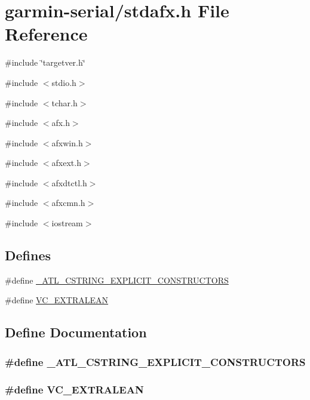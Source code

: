 \hypertarget{garmin-serial_2stdafx_8h}{
\section{garmin-\/serial/stdafx.h File Reference}
\label{garmin-serial_2stdafx_8h}
}
{\ttfamily \#include \char`\"{}targetver.h\char`\"{}}\par
{\ttfamily \#include $<$stdio.h$>$}\par
{\ttfamily \#include $<$tchar.h$>$}\par
{\ttfamily \#include $<$afx.h$>$}\par
{\ttfamily \#include $<$afxwin.h$>$}\par
{\ttfamily \#include $<$afxext.h$>$}\par
{\ttfamily \#include $<$afxdtctl.h$>$}\par
{\ttfamily \#include $<$afxcmn.h$>$}\par
{\ttfamily \#include $<$iostream$>$}\par
\subsection*{Defines}
\begin{DoxyCompactItemize}
\item 
\#define \hyperlink{garmin-serial_2stdafx_8h_a137e19a46f145129447af81af06def9f}{\_\-ATL\_\-CSTRING\_\-EXPLICIT\_\-CONSTRUCTORS}
\item 
\#define \hyperlink{garmin-serial_2stdafx_8h_a0172fbace36625330d5f0f163a1ddc1a}{VC\_\-EXTRALEAN}
\end{DoxyCompactItemize}


\subsection{Define Documentation}
\hypertarget{garmin-serial_2stdafx_8h_a137e19a46f145129447af81af06def9f}{
\subsubsection[{\_\-ATL\_\-CSTRING\_\-EXPLICIT\_\-CONSTRUCTORS}]{\setlength{\rightskip}{0pt plus 5cm}\#define \_\-ATL\_\-CSTRING\_\-EXPLICIT\_\-CONSTRUCTORS}}
\label{garmin-serial_2stdafx_8h_a137e19a46f145129447af81af06def9f}
\hypertarget{garmin-serial_2stdafx_8h_a0172fbace36625330d5f0f163a1ddc1a}{
\subsubsection[{VC\_\-EXTRALEAN}]{\setlength{\rightskip}{0pt plus 5cm}\#define VC\_\-EXTRALEAN}}
\label{garmin-serial_2stdafx_8h_a0172fbace36625330d5f0f163a1ddc1a}
